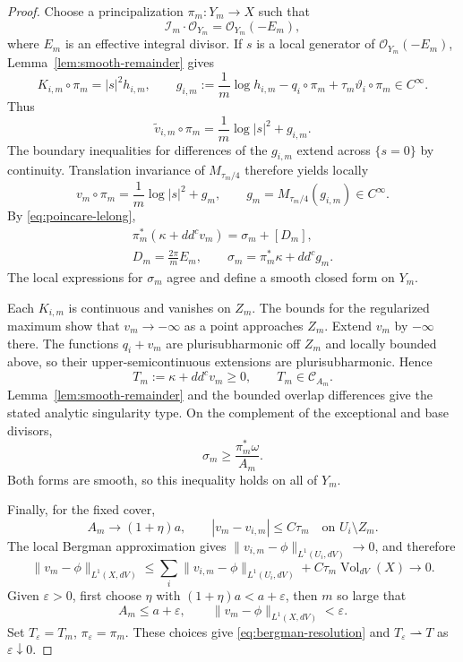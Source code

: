 \documentclass[reqno]{amsart}
\numberwithin{equation}{section}
\theoremstyle{definition}
\begin{document}
\begin{proof}
Choose a principalization $\pi_m:Y_m\to X$ such that
\[
\mathcal I_m\cdot\mathcal O_{Y_m}=\mathcal O_{Y_m}(-E_m),
\]
where $E_m$ is an effective integral divisor.
If $s$ is a local generator of $\mathcal O_{Y_m}(-E_m)$,
Lemma~\ref{lem:smooth-remainder} gives
\[
K_{i,m}\circ\pi_m=|s|^2h_{i,m},\qquad
g_{i,m}:=\frac1m\log h_{i,m}-q_i\circ\pi_m
             +\tau_m\vartheta_i\circ\pi_m\in C^\infty.
\]
Thus
\[
\widetilde v_{i,m}\circ\pi_m
=\frac1m\log|s|^2+g_{i,m}.
\]
The boundary inequalities for differences of the $g_{i,m}$
extend across $\{s=0\}$ by continuity. Translation invariance
of $M_{\tau_m/4}$ therefore yields locally
\[
v_m\circ\pi_m
=\frac1m\log|s|^2+g_m,\qquad
g_m=M_{\tau_m/4}(g_{i,m})\in C^\infty.
\]
By \eqref{eq:poincare-lelong},
\begin{equation}\label{eq:resolved-current}
\begin{gathered}
\pi_m^*(\kappa+dd^cv_m)=\sigma_m+[D_m],\\
D_m=\frac{2\pi}{m}E_m,\qquad
\sigma_m=\pi_m^*\kappa+dd^cg_m.
\end{gathered}
\end{equation}
The local expressions for $\sigma_m$ agree and define a smooth
closed form on $Y_m$.

Each $K_{i,m}$ is continuous and vanishes on $Z_m$.
The bounds for the regularized maximum show that $v_m\to-\infty$
as a point approaches $Z_m$.
Extend $v_m$ by $-\infty$ there.
The functions $q_i+v_m$ are plurisubharmonic off $Z_m$ and
locally bounded above, so their upper-semicontinuous extensions
are plurisubharmonic. Hence
\[
T_m:=\kappa+dd^cv_m\ge0,\qquad T_m\in\mathcal C_{A_m}.
\]
Lemma~\ref{lem:smooth-remainder} and the bounded
overlap differences give the stated analytic singularity type.
On the complement of the exceptional and base divisors,
\[
\sigma_m\ge\frac{\pi_m^*\omega}{A_m}.
\]
Both forms are smooth, so this inequality holds on all of $Y_m$.

Finally, for the fixed cover,
\[
A_m\longrightarrow(1+\eta)a,\qquad
|v_m-v_{i,m}|\le C\tau_m
\quad\text{on }U_i\setminus Z_m.
\]
The local Bergman approximation gives
$\|v_{i,m}-\phi\|_{L^1(U_i,dV)}\to0$, and therefore
\[
\|v_m-\phi\|_{L^1(X,dV)}
\le\sum_i\|v_{i,m}-\phi\|_{L^1(U_i,dV)}
 +C\tau_m\operatorname{Vol}_{dV}(X)
\longrightarrow0.
\]
Given $\varepsilon>0$, first choose $\eta$ with
$(1+\eta)a<a+\varepsilon$, then $m$ so large that
\[
A_m\le a+\varepsilon,\qquad
\|v_m-\phi\|_{L^1(X,dV)}<\varepsilon.
\]
Set $T_\varepsilon=T_m$, $\pi_\varepsilon=\pi_m$.
These choices give \eqref{eq:bergman-resolution}
and $T_\varepsilon\rightharpoonup T$ as $\varepsilon\downarrow0$.
\end{proof}
\end{document}
